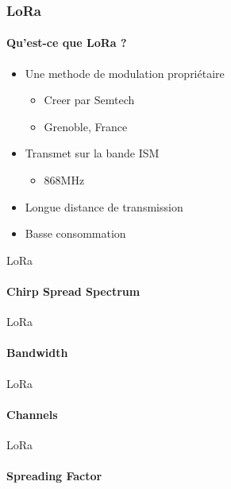 \begin{frame}[t]
\frametitle{LoRa}
\framesubtitle{Qu'est-ce que LoRa ?}
\begin{itemize}
  \item Une methode de modulation propriétaire
  \begin{itemize}
    \item Creer par Semtech
    \item Grenoble, France
  \end{itemize}
  \item Transmet sur la bande ISM
  \begin{itemize}
    \item 868MHz
  \end{itemize}
  \item Longue distance de transmission
  \item Basse consommation
\end{itemize}
\end{frame}

\begin{frame}{LoRa}
\framesubtitle{Chirp Spread Spectrum}

\end{frame}

\begin{frame}{LoRa}
\framesubtitle{Bandwidth}
\end{frame}

\begin{frame}{LoRa}
\framesubtitle{Channels}
\end{frame}

\begin{frame}{LoRa}
\framesubtitle{Spreading Factor}

\end{frame}
